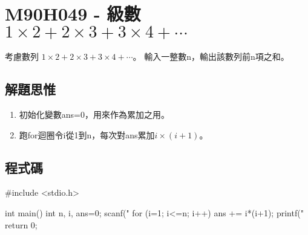 \section{M90H049 - 級數 $1\times 2+2\times 3+3\times 4+\cdots$}
考慮數列 $1\times 2+2\times 3+3\times 4+\cdots$。 
輸入一整數n，輸出該數列前n項之和。
\subsection{解題思惟}
\begin{enumerate}
	\item 初始化變數ans=0，用來作為累加之用。
	\item 跑for迴圈令i從1到n，每次對ans累加$i\times(i+1)$。
\end{enumerate}
\subsection{程式碼}
\begin{cppcode}
	#include <stdio.h>
	
	int main()
	{
		int n, i, ans=0;
		scanf("%
		for (i=1; i<=n; i++) {
			ans += i*(i+1);
		}
		printf("%
		return 0;
	}
	
\end{cppcode}
